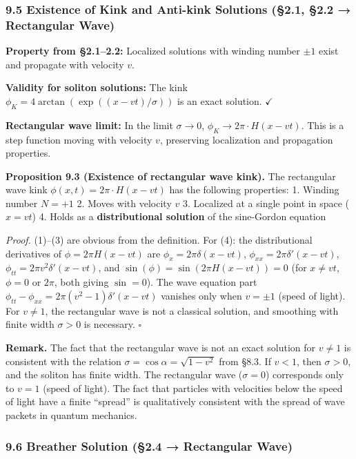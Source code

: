 \documentclass[a4paper,11pt]{article}
\begin{document}
\subsubsection{9.5 Existence of Kink and Anti-kink Solutions (§2.1, §2.2
→ Rectangular
Wave)}\label{existence-of-kink-and-anti-kink-solutions-2.1-2.2-rectangular-wave}

\textbf{Property from §2.1--2.2:} Localized solutions with winding
number \(\pm 1\) exist and propagate with velocity \(v\).

\textbf{Validity for soliton solutions:} The kink
\(\phi_K = 4\arctan(\exp((x-vt)/\sigma))\) is an exact solution.
\(\checkmark\)

\textbf{Rectangular wave limit:} In the limit \(\sigma \to 0\),
\(\phi_K \to 2\pi \cdot H(x - vt)\). This is a step function moving with
velocity \(v\), preserving localization and propagation properties.

\textbf{Proposition 9.3 (Existence of rectangular wave kink).} The
rectangular wave kink \(\phi(x, t) = 2\pi \cdot H(x - vt)\) has the
following properties: 1. Winding number \(N = +1\) 2. Moves with
velocity \(v\) 3. Localized at a single point in space (\(x = vt\)) 4.
Holds as a \textbf{distributional solution} of the sine-Gordon equation

\emph{Proof.} (1)--(3) are obvious from the definition. For (4): the
distributional derivatives of \(\phi = 2\pi H(x - vt)\) are
\(\phi_x = 2\pi\delta(x-vt)\), \(\phi_{xx} = 2\pi\delta'(x-vt)\),
\(\phi_{tt} = 2\pi v^2\delta'(x-vt)\), and
\(\sin(\phi) = \sin(2\pi H(x-vt)) = 0\) (for \(x \neq vt\), \(\phi = 0\)
or \(2\pi\), both giving \(\sin = 0\)). The wave equation part
\(\phi_{tt} - \phi_{xx} = 2\pi(v^2-1)\delta'(x-vt)\) vanishes only when
\(v = \pm 1\) (speed of light). For \(v \neq 1\), the rectangular wave
is not a classical solution, and smoothing with finite width
\(\sigma > 0\) is necessary. \(\square\)

\textbf{Remark.} The fact that the rectangular wave is not an exact
solution for \(v \neq 1\) is consistent with the relation
\(\sigma = \cos\alpha = \sqrt{1-v^2}\) from §8.3. If \(v < 1\), then
\(\sigma > 0\), and the soliton has finite width. The rectangular wave
(\(\sigma = 0\)) corresponds only to \(v = 1\) (speed of light). The
fact that particles with velocities below the speed of light have a
finite ``spread'' is qualitatively consistent with the spread of wave
packets in quantum mechanics.

\subsubsection{9.6 Breather Solution (§2.4 → Rectangular
Wave)}\label{breather-solution-2.4-rectangular-wave}
\end{document}
